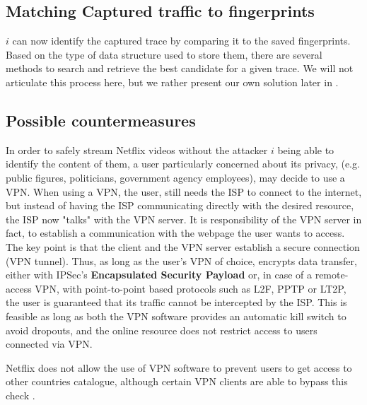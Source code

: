 \subsection{Matching Captured traffic to fingerprints}

$i$ can now identify the captured trace by comparing it to the saved
fingerprints. Based on the type of data structure used to store them, there
are several methods to search and retrieve the best candidate for a given
trace. We will not articulate this process here, but we rather present our own
solution later in .

\subsection{Possible countermeasures}\label{sec:vpn}

In order to safely stream Netflix videos without the attacker $i$ being able to
identify the content of them, a user particularly concerned about its privacy,
(e.g.  public figures, politicians, government agency employees), may decide to
use a VPN. When using a VPN, the user, still needs the ISP to connect to the
internet, but instead of having the ISP communicating directly with the desired
resource, the ISP now "talks" with the VPN server. It is responsibility of the
VPN server in fact, to establish a communication with the webpage the user
wants to access.  The key point is that the client and the VPN server establish
a secure connection (VPN tunnel). Thus, as long as the user's VPN of choice,
encrypts data transfer, either with IPSec's \textbf{Encapsulated Security
Payload} or, in case of a remote-access VPN, with point-to-point based
protocols such as L2F, PPTP or LT2P, the user is guaranteed that its traffic
cannot be intercepted by the ISP. This is feasible as long as both the VPN
software provides an automatic kill switch to avoid dropouts, and the online
resource does not restrict access to users connected via VPN. 

Netflix does not allow the use of VPN software to prevent users to get access
to other countries catalogue, although certain VPN clients are able to bypass
this check \cite{nordvpn}.
